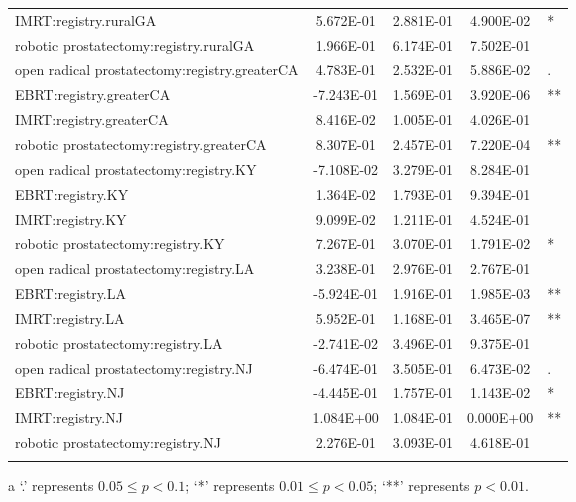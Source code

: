 \documentclass[12pt]{article}
\begin{document}
{\begin{longtable}{lcccl}
  IMRT:registry.ruralGA & 5.672E-01 & 2.881E-01 & 4.900E-02 & * \\ 
   robotic prostatectomy:registry.ruralGA & 1.966E-01 & 6.174E-01 & 7.502E-01 &  \\ 
  open radical prostatectomy:registry.greaterCA & 4.783E-01 & 2.532E-01 & 5.886E-02 & . \\ 
  EBRT:registry.greaterCA & -7.243E-01 & 1.569E-01 & 3.920E-06 & ** \\ 
  IMRT:registry.greaterCA & 8.416E-02 & 1.005E-01 & 4.026E-01 &  \\ 
   robotic prostatectomy:registry.greaterCA & 8.307E-01 & 2.457E-01 & 7.220E-04 & ** \\ 
  open radical prostatectomy:registry.KY & -7.108E-02 & 3.279E-01 & 8.284E-01 &  \\ 
  EBRT:registry.KY & 1.364E-02 & 1.793E-01 & 9.394E-01 &  \\ 
  IMRT:registry.KY & 9.099E-02 & 1.211E-01 & 4.524E-01 &  \\ 
   robotic prostatectomy:registry.KY & 7.267E-01 & 3.070E-01 & 1.791E-02 & * \\ 
  open radical prostatectomy:registry.LA & 3.238E-01 & 2.976E-01 & 2.767E-01 &  \\ 
  EBRT:registry.LA & -5.924E-01 & 1.916E-01 & 1.985E-03 & ** \\ 
  IMRT:registry.LA & 5.952E-01 & 1.168E-01 & 3.465E-07 & ** \\ 
   robotic prostatectomy:registry.LA & -2.741E-02 & 3.496E-01 & 9.375E-01 &  \\ 
  open radical prostatectomy:registry.NJ & -6.474E-01 & 3.505E-01 & 6.473E-02 & . \\ 
  EBRT:registry.NJ & -4.445E-01 & 1.757E-01 & 1.143E-02 & * \\ 
  IMRT:registry.NJ & 1.084E+00 & 1.084E-01 & 0.000E+00 & ** \\ 
   robotic prostatectomy:registry.NJ & 2.276E-01 & 3.093E-01 & 4.618E-01 &  \\ 
   \hline
\hline
\label{ALongTable}
\end{longtable}
\begin{tablenotes}
\item[a]\small{`.' represents $0.05 \leq p < 0.1$;  `*' represents $0.01 \leq p < 0.05$; `**' represents $p < 0.01$.}
\end{tablenotes}
}
\pagebreak
\end{document}
